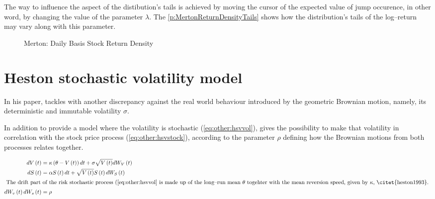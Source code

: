 \documentclass[a4paper, 12pt]{report}
\newcommand{\Bmsub}[1]{W_{#1}\left(t\right)}
\newcommand{\St}{S\left(t\right)}
\newcommand{\Vt}{V\left(t\right)}
\newcommand{\HSVstock}{
  d\St &= \alpha \St dt + \sqrt{\Vt} \St d \Bmsub{S}
}
\newcommand{\HSVvol}{
  d\Vt &= \kappa\left(\theta - \Vt \right) dt + \sigma \sqrt{\Vt} d \Bmsub{V}
}
\begin{document}
The way to influence the aspect of the distibution's tails is achieved by moving the cursor of the expected value of jump occurence, in other word, by changing the value of the parameter $\lambda$. The \cref{p:MertonReturnDensityTails} shows how the distribution's tails of the log--return may vary along with this parameter.

\begin{figure}[ht]
\centering

\caption{Merton: Daily Basis Stock Return Density}
\label{plot:MertonReturnDensityTails}
\end{figure}













\section{Heston stochastic volatility model}
\label{sec:other:heston}

In his paper, \citet{heston1993} tackles with another discrepancy against the real world behaviour introduced by the geometric Brownian motion, namely, its deterministic and immutable volatility $\sigma$.

In addition to provide a model where the volatility is stochastic (\cref{eq:other:hsvvol}), \citet{heston1993} gives the possibility to make that volatility in correlation with the stock price process (\cref{eq:other:hsvstock}), according to the parameter $\rho$ defining how the Brownian motions from both processes relates together.

\begin{align}
    \HSVvol \label{eq:other:hsvvol} \\
    \HSVstock \label{eq:other:hsvstock} \\
    \intertext{
    The drift part of the risk stochastic process (\ref{eq:other:hsvvol} is made up of the long--run mean $\theta$ togehter with the mean reversion speed, given by $\kappa$, \citet{heston1993}.
    }
    d\Bmsub{v} d\Bmsub{s} &= \rho \label{eq:other:rho}
\end{align}
\end{document}
